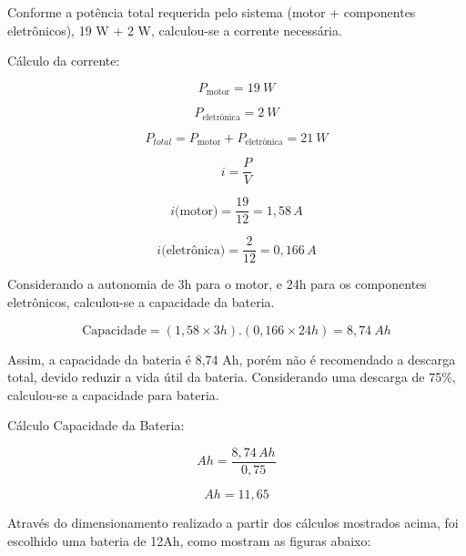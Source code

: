 Conforme a potência total requerida pelo sistema (motor + componentes eletrônicos), 19 W + 2 W, calculou-se a corrente necessária.

Cálculo da corrente:

\begin{equation}
P_\text{motor}=19~W
\end{equation}

\begin{equation}
P_\text{eletrônica}=2~W
\end{equation}

\begin{equation}
P_{total}=P_\text{motor}+P_\text{eletrônica}=21~W
\end{equation}

\begin{equation}
i=\frac{P}{V}
\end{equation}

\begin{equation}
i\text{(motor)}=\frac{19}{12} = 1,58\,A
\end{equation}

\begin{equation}
i\text{(eletrônica)}=\frac{2}{12} = 0,166\,A
\end{equation}

Considerando a autonomia de 3h para o motor, e 24h para os componentes eletrônicos, calculou-se a capacidade da bateria.

\begin{equation}
\text{Capacidade}=(1,58\times3h).(0,166\times24h)=8,74~Ah
\end{equation}

Assim, a capacidade da bateria é 8,74 Ah, porém não é recomendado a descarga total, devido reduzir a vida útil da bateria. Considerando uma descarga de 75\%, calculou-se a capacidade para bateria.

Cálculo Capacidade da Bateria:

\begin{equation}
Ah=\frac{8,74\,Ah}{0,75}
\end{equation}

\begin{equation}
Ah=11,65
\end{equation}

Através do dimensionamento realizado a partir dos cálculos mostrados acima, foi escolhido uma bateria de 12Ah, como mostram as figuras abaixo:

%

